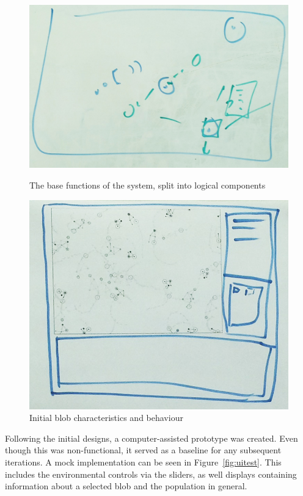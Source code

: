 \begin{figure}[!th]
	\centering
	\begin{minipage}[b]{0.45\textwidth}
		\includegraphics[scale=0.24]{images/testinterface2}
		\caption{\label{fig:test1}The base functions of the system, split into logical components}
	\end{minipage}
	\hfill
	\begin{minipage}[b]{0.45\textwidth}
		\includegraphics[scale=0.27]{images/testinterface}
		\caption{\label{fig:test2}Initial blob characteristics and behaviour}
	\end{minipage}
\end{figure}

Following the initial designs, a computer-assisted prototype was created. Even though this was non-functional, it served as a baseline for any subsequent iterations. A mock implementation can be seen in Figure~\ref{fig:uitest}. This includes the environmental controls via the sliders, as well displays containing information about a selected blob and the population in general.

